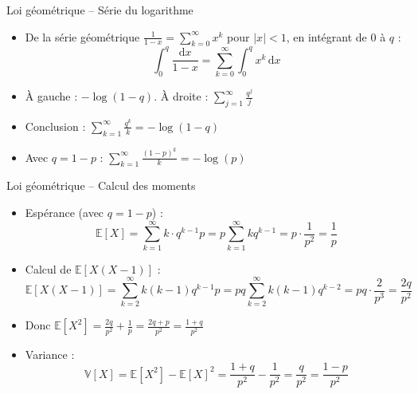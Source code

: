 \documentclass[11pt,aspectratio=169]{beamer}
\newcommand{\dd}{\mathrm{d}}
\begin{document}
\begin{frame}{Loi géométrique -- Série du logarithme}

\begin{itemize}

\item De la série géométrique $\frac{1}{1-x} = \sum_{k=0}^{\infty} x^k$ pour $|x| < 1$, en intégrant de 0 à $q$ :
  \[
  \int_0^q \frac{\dd x}{1-x} = \sum_{k=0}^{\infty} \int_0^q x^k \, \dd x
  \]

\item À gauche : $-\log(1-q)$. À droite : $\sum_{j=1}^{\infty} \frac{q^j}{j}$\newline

\item Conclusion : $\boxed{\displaystyle\sum_{k=1}^{\infty} \frac{q^k}{k} = -\log(1-q)}$\newline

\item Avec $q = 1-p$ : $\displaystyle\sum_{k=1}^{\infty} \frac{(1-p)^k}{k} = -\log(p)$

\end{itemize}

\end{frame}

\begin{frame}{Loi géométrique -- Calcul des moments}

\begin{itemize}

\item Espérance (avec $q = 1-p$) :
  \[
  \mathbb{E}[X] = \sum_{k=1}^{\infty} k \cdot q^{k-1} p = p \sum_{k=1}^{\infty} k q^{k-1} = p \cdot \frac{1}{p^2} = \boxed{\frac{1}{p}}
  \]

\item Calcul de $\mathbb{E}[X(X-1)]$ :
  \[
  \mathbb{E}[X(X-1)] = \sum_{k=2}^{\infty} k(k-1) q^{k-1} p = pq \sum_{k=2}^{\infty} k(k-1) q^{k-2} = pq \cdot \frac{2}{p^3} = \frac{2q}{p^2}
  \]

\item Donc $\mathbb{E}[X^2] = \frac{2q}{p^2} + \frac{1}{p} = \frac{2q + p}{p^2} = \frac{1+q}{p^2}$\newline

\item Variance :
  \[
  \mathbb{V}[X] = \mathbb{E}[X^2] - \mathbb{E}[X]^2 = \frac{1+q}{p^2} - \frac{1}{p^2} = \frac{q}{p^2} = \boxed{\frac{1-p}{p^2}}
  \]

\end{itemize}

\end{frame}
\end{document}
